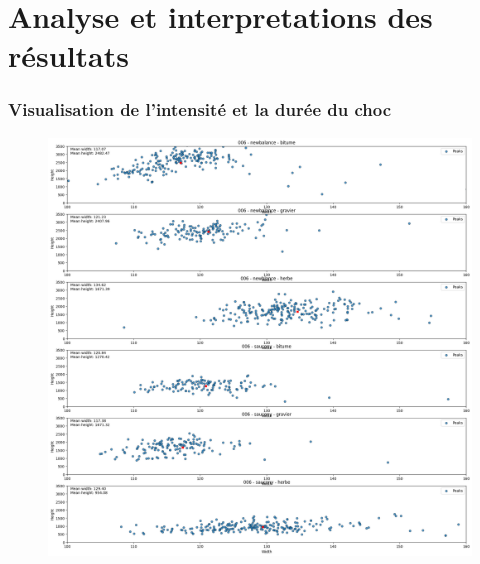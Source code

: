 \section{Analyse et interpretations des résultats}
\begin{frame}
\frametitle{Visualisation de l'intensité et la durée du choc}
\begin{figure}[!h]
\includegraphics[scale=0.2]{./figures/res_02.png}
\end{figure}
\end{frame}
